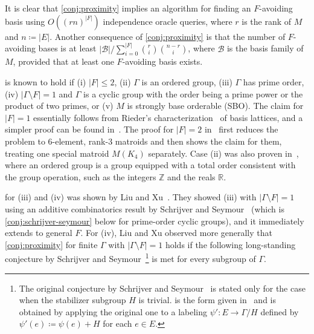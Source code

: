 \documentclass{article}
\theoremstyle{definition}
\newcommand{\Z}{\mathbb{Z}}
\newcommand{\R}{\mathbb{R}}
\begin{document}
It is clear that \cref{conj:proximity} implies an algorithm for finding an $F$-avoiding basis using $O((rn)^{|F|})$ independence oracle queries, where $r$ is the rank of $M$ and $n \coloneqq |E|$.
Another consequence of \cref{conj:proximity} is that the number of $F$-avoiding bases is at least $|\mathcal{B}|/\sum_{i=0}^{|F|} \binom{r}{i}\binom{n-r}{i}$, where $\mathcal{B}$ is the basis family of $M$, provided that at least one $F$-avoiding basis exists.

 is known to hold if (i) $|F| \le 2$,  (ii) $\Gamma$ is an ordered group, (iii) $\Gamma$ has prime order, (iv) $|\Gamma \setminus F| = 1$ and $\Gamma$ is a cyclic group with the order being a prime power or the product of two primes, or (v) $M$ is strongly base orderable (SBO). The claim for $|F| = 1$ essentially follows from Rieder's characterization~\cite{rieder1991lattices} of basis lattices, and a simpler proof can be found in~\cite{horsch2024problems}.
The proof for $|F| = 2$ in~\cite{horsch2024problems} first reduces the problem to 6-element, rank-3 matroids and then shows the claim for them, treating one special matroid $M(K_4)$ separately.
Case (ii) was also proven in~\cite{horsch2024problems}, where an ordered group is a group equipped with a total order consistent with the group operation, such as the integers $\Z$ and the reals $\R$. 

 for (iii) and (iv) was shown by Liu and Xu~\cite{liu2023congruency}.
They showed (iii) with $|\Gamma \setminus F| = 1$ using an additive combinatorics result by Schrijver and Seymour~\cite{schrijver1990spanning} (which is \cref{conj:schrijver-seymour} below for prime-order cyclic groups), and it immediately extends to general $F$.
For (iv), Liu and Xu observed more generally that \cref{conj:proximity} for finite $\Gamma$ with $|\Gamma \setminus F| = 1$ holds if the following long-standing conjecture by Schrijver and Seymour~\cite{schrijver1990spanning}\footnote{The original conjecture by Schrijver and Seymour~\cite{schrijver1990spanning} is stated only for the case when the stabilizer subgroup $H$ is trivial.
   is the form given in~\cite{devos2009generalization} and is obtained by applying the original one to a labeling $\psi'\colon E \to \Gamma / H$ defined by $\psi'(e) \coloneqq \psi(e) + H$ for each $e \in E$.
}
is met for every subgroup of $\Gamma$.
\end{document}
